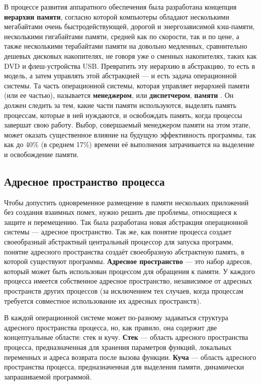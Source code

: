 В процессе развития аппаратного обеспечения была разработана концепция \textbf{иерархии памяти}, согласно которой компьютеры обладают несколькими мегабайтами очень быстродействующей, дорогой и энергозависимой кэш-памяти, несколькими гигабайтами памяти, средней как по скорости, так и по цене, а также несколькими терабайтами памяти на довольно медленных, сравнительно дешевых дисковых накопителях, не говоря уже о сменных накопителях, таких как DVD и флеш-устройства USB. Превратить эту иерархию в абстракцию, то есть в модель, а затем управлять этой абстракцией --- и есть задача операционной системы. Та часть операционной системы, которая управляет иерархией памяти (или ее частью), называется \textbf{менеджером}, или \textbf{диспетчером}, \textbf{памяти} \cite{tannenbaum}. Он должен следить за тем, какие части памяти используются, выделять память процессам, которые в ней нуждаются, и освобождать память, когда процессы завершат свою работу. Выбор, совершаемый менеджером памяти на этом этапе, может оказать существенное влияние на будущую эффективность программы, так как до 40\% (в среднем 17\%) времени её выполнения затрачивается на выделение и освобождение памяти. \cite{cornell}

\subsection{Адресное пространство процесса}

Чтобы допустить одновременное размещение в памяти нескольких приложений без создания взаимных помех, нужно решить две проблемы, относящиеся к защите и перемещению. Так была разработана новая абстракция операционной системы --- адресное пространство. Так же, как понятие процесса создает своеобразный абстрактный центральный процессор для запуска программ, понятие адресного пространства создаёт своеобразную абстрактную память, в которой существуют программы. \textbf{Адресное пространство} \cite{tannenbaum} --- это набор адресов, который может быть использован процессом для обращения к памяти. У каждого процесса имеется собственное адресное пространство, независимое от адресных пространств других процессов (за исключением тех случаев, когда процессам требуется совместное использование их адресных пространств).

В каждой операционной системе может по-разному задаваться структура адресного пространства процесса, но, как правило, она содержит две концептуальные области: стек и кучу. \textbf{Стек} \cite{windows} --- область адресного пространства процесса, предназначенная для хранения параметров функций, локальных переменных и адреса возврата после вызова функции. \textbf{Куча} \cite{linux} --- область адресного пространства процесса, предназначенная для выделения памяти, динамически запрашиваемой программой.

